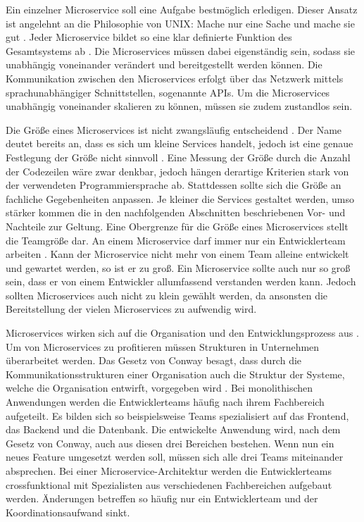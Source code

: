 Ein einzelner Microservice soll eine Aufgabe bestmöglich erledigen. Dieser Ansatz ist angelehnt an die Philosophie von \ac{UNIX}: \glqq Mache nur eine Sache und mache sie gut\grqq{} \parencite[vgl.][]{salusQuarter1994}. Jeder Microservice bildet so eine klar definierte Funktion des Gesamtsystems ab \parencite[vgl.][S. 64]{trempArchitekturen2021}. Die Microservices müssen dabei eigenständig sein, sodass sie unabhängig voneinander verändert und bereitgestellt werden können. Die Kommunikation zwischen den Microservices erfolgt über das Netzwerk mittels sprachunabhängiger Schnittstellen, sogenannte \acp{API}. Um die Microservices unabhängig voneinander skalieren zu können, müssen sie zudem zustandlos sein.

Die Größe eines Microservices ist nicht zwangsläufig entscheidend \parencite[vgl.][S. 2]{wolffMicroservices2018}. Der Name deutet bereits an, dass es sich um kleine Services handelt, jedoch ist eine genaue Festlegung der Größe nicht sinnvoll \parencite[vgl.][S. 22]{newmanMicroservices2015}. Eine Messung der Größe durch die Anzahl der Codezeilen wäre zwar denkbar, jedoch hängen derartige Kriterien stark von der verwendeten Programmiersprache ab. Stattdessen sollte sich die Größe an fachliche Gegebenheiten anpassen. Je kleiner die Services gestaltet werden, umso stärker kommen die in den nachfolgenden Abschnitten beschriebenen Vor- und Nachteile zur Geltung. Eine Obergrenze für die Größe eines Microservices stellt die Teamgröße dar. An einem Microservice darf immer nur ein Entwicklerteam arbeiten \parencite[vgl.][S. 23]{newmanMicroservices2015}. Kann der Microservice nicht mehr von einem Team alleine entwickelt und gewartet werden, so ist er zu groß. Ein Microservice sollte auch nur so groß sein, dass er von einem Entwickler allumfassend verstanden werden kann. Jedoch sollten Microservices auch nicht zu klein gewählt werden, da ansonsten die Bereitstellung der vielen Microservices zu aufwendig wird.

Microservices wirken sich auf die Organisation und den Entwicklungsprozess aus \parencite[vgl.][S. 2]{wolffMicroservices2018}. Um von Microservices zu profitieren müssen Strukturen in Unternehmen überarbeitet werden. Das Gesetz von Conway besagt, dass durch die Kommunikationsstrukturen einer Organisation auch die Struktur der Systeme, welche die Organisation entwirft, vorgegeben wird \parencite[vgl.]{conwayHow1968}. Bei monolithischen Anwendungen werden die Entwicklerteams häufig nach ihrem Fachbereich aufgeteilt. Es bilden sich so beispielsweise Teams spezialisiert auf das Frontend, das Backend und die Datenbank. Die entwickelte Anwendung wird, nach dem Gesetz von Conway, auch aus diesen drei Bereichen bestehen. Wenn nun ein neues Feature umgesetzt werden soll, müssen sich alle drei Teams miteinander absprechen. Bei einer Microservice-Architektur werden die Entwicklerteams crossfunktional mit Spezialisten aus verschiedenen Fachbereichen aufgebaut werden. Änderungen betreffen so häufig nur ein Entwicklerteam und der Koordinationsaufwand sinkt.

